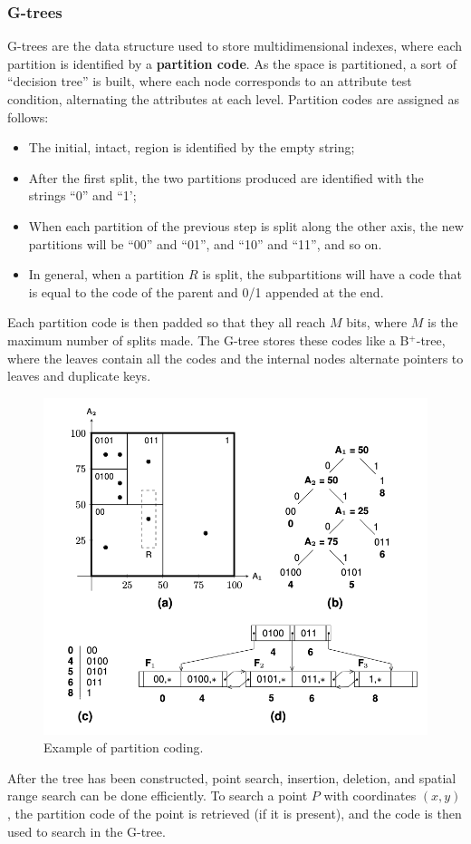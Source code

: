 \subsubsection{G-trees}

G-trees are the data structure used to store multidimensional indexes, where each partition is identified by a \textbf{partition code}. As the space is partitioned, a sort of ``decision tree'' is built, where each node corresponds to an attribute test condition, alternating the attributes at each level. Partition codes are assigned as follows:
\begin{itemize}
    \item The initial, intact, region is identified by the empty string;

    \item After the first split, the two partitions produced are identified with the strings ``0'' and ``1';

    \item When each partition of the previous step is split along the other axis, the new partitions will be ``00'' and ``01'', and ``10'' and ``11'', and so on.

    \item In general, when a partition $R$ is split, the subpartitions will have a code that is equal to the code of the parent and 0/1 appended at the end.
\end{itemize}
Each partition code is then padded so that they all reach $M$ bits, where $M$ is the maximum number of splits made. The G-tree stores these codes like a B$^+$-tree, where the leaves contain all the codes and the internal nodes alternate pointers to leaves and duplicate keys.
\begin{figure}[h]
    \centering
    \includegraphics[width=0.5\linewidth]{img/G-tree.png}
    \caption{Example of partition coding.}
    \label{fig:G-tree}
\end{figure}
After the tree has been constructed, point search, insertion, deletion, and spatial range search can be done efficiently. To search a point $P$ with coordinates $(x, y)$, the partition code of the point is retrieved (if it is present), and the code is then used to search in the G-tree.

